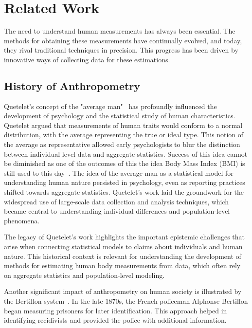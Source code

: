 \chapter{Related Work}

The need to understand human measurements has always been essential. The methods for obtaining these measurements have continually evolved, and today, they rival traditional techniques in precision. This progress has been driven by innovative ways of collecting data for these estimations.

\section{History of Anthropometry}
Quetelet's concept of the "average man"~\cite{QUETELET} has profoundly influenced the development of psychology and the statistical study of human characteristics. Quetelet argued that measurements of human traits would conform to a normal distribution, with the average representing the true or ideal type. This notion of the average as representative allowed early psychologists to blur the distinction between individual-level data and aggregate statistics. Success of this idea cannot be diminished as one of the outcomes of this the idea Body Mass Index (BMI) is still used to this day~\cite{bmiUsage}. The idea of the average man as a statistical model for understanding human nature persisted in psychology, even as reporting practices shifted towards aggregate statistics. Quetelet's work laid the groundwork for the widespread use of large-scale data collection and analysis techniques, which became central to understanding individual differences and population-level phenomena. 

The legacy of Quetelet's work highlights the important epistemic challenges that arise when connecting statistical models to claims about individuals and human nature. This historical context is relevant for understanding the development of methods for estimating human body measurements from data, which often rely on aggregate statistics and population-level modeling.

Another significant impact of anthropometry on human society is illustrated by the Bertillon system~\cite{sus}. In the late 1870s, the French policeman Alphonse Bertillon began measuring prisoners for later identification. This approach helped in identifying recidivists and provided the police with additional information.

